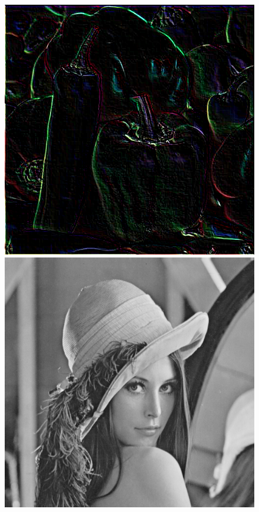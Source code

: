 \documentclass{article}
\begin{document}
\begin{figure}[!htb]
\includegraphics[scale=0.2]{img/_Filtr_Gradientowy_peppers_24bit.png}\\ 
\includegraphics[scale=0.2]{img/lena_8bit.png}  

\end{figure}
\end{document}
